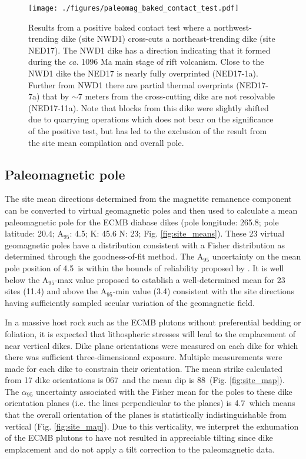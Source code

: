 \documentclass[draft]{agujournal2019}
\begin{document}
\begin{figure}[!ht]
\noindent\texttt{[image: ./figures/paleomag\_baked\_contact\_test.pdf]}
\caption{\small{Results from a positive baked contact test where a northwest-trending dike (site NWD1) cross-cuts a northeast-trending dike (site NED17). The NWD1 dike has a direction indicating that it formed during the \textit{ca.} 1096 Ma main stage of rift volcanism. Close to the NWD1 dike the NED17 is nearly fully overprinted (NED17-1a). Further from NWD1 there are partial thermal overprints (NED17-7a) that by $\sim$7 meters from the cross-cutting dike are not resolvable (NED17-11a). Note that blocks from this dike were slightly shifted due to quarrying operations which does not bear on the significance of the positive test, but has led to the exclusion of the result from the site mean compilation and overall pole.}}
\label{fig:baked_contact}
\end{figure}

\subsection{Paleomagnetic pole}

The site mean directions determined from the magnetite remanence component can be converted to virtual geomagnetic poles and then used to calculate a mean paleomagnetic pole for the ECMB diabase dikes (pole longitude: 265.8\textdegree; pole latitude: 20.4\textdegree; A$_{95}$: 4.5\textdegree; K: 45.6 N: 23; Fig. \ref{fig:site_means}). These 23 virtual geomagnetic poles have a distribution consistent with a Fisher distribution as determined through the  goodness-of-fit method. The A$_{95}$ uncertainty on the mean pole position of 4.5\textdegree\ is within the bounds of reliability proposed by . It is well below the A$_{95}$-max value proposed to establish a well-determined mean for 23 sites (11.4\textdegree) and above the A$_{95}$-min value (3.4\textdegree) consistent with the site directions having sufficiently sampled secular variation of the geomagnetic field.  

In a massive host rock such as the ECMB plutons without preferential bedding or foliation, it is expected that lithospheric stresses will lead to the emplacement of near vertical dikes. Dike plane orientations were measured on each dike for which there was sufficient three-dimensional exposure. Multiple measurements were made for each dike to constrain their orientation. The mean strike calculated from 17 dike orientations is 067\textdegree\ and the mean dip is 88\textdegree\ (Fig. \ref{fig:site_map}). The $\alpha_{95}$ uncertainty associated with the Fisher mean for the poles to these dike orientation planes (i.e. the lines perpendicular to the planes) is 4.7\textdegree\ which means that the overall orientation of the planes is statistically indistinguishable from vertical (Fig. \ref{fig:site_map}). Due to this verticality, we interpret the exhumation of the ECMB plutons to have not resulted in appreciable tilting since dike emplacement and do not apply a tilt correction to the paleomagnetic data.
\end{document}
